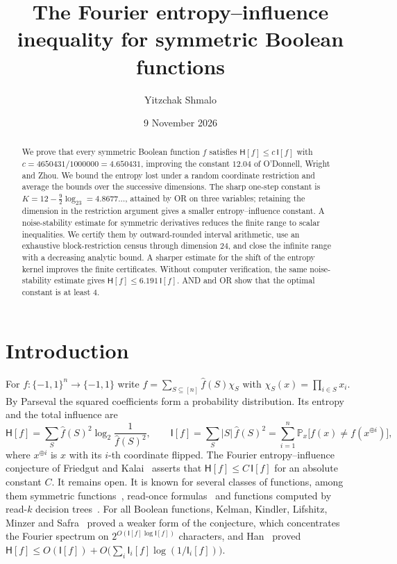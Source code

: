 \documentclass[11pt]{amsart}
\title[Fourier entropy of symmetric functions]{The Fourier entropy--influence inequality for symmetric Boolean functions}
\author{Yitzchak Shmalo}
\date{9 November 2026}
\theoremstyle{definition}
\theoremstyle{remark}
\newcommand{\bits}{\{-1,1\}}
\renewcommand{\P}{\mathbb P}
\newcommand{\HH}{\mathsf H}
\newcommand{\I}{\mathsf I}
\newcommand{\wh}[1]{\widehat{#1}}
\begin{document}
\begin{abstract}
We prove that every symmetric Boolean function $f$ satisfies $\HH[f]\le c\,\I[f]$ with $c=4650431/1000000=4.650431$, improving the constant $12.04$ of O'Donnell, Wright and Zhou. We bound the entropy lost under a random coordinate restriction and average the bounds over the successive dimensions. The sharp one-step constant is $K=12-\frac92\log_23=4.8677\ldots$, attained by OR on three variables; retaining the dimension in the restriction argument gives a smaller entropy--influence constant. A noise-stability estimate for symmetric derivatives reduces the finite range to scalar inequalities. We certify them by outward-rounded interval arithmetic, use an exhaustive block-restriction census through dimension $24$, and close the infinite range with a decreasing analytic bound. A sharper estimate for the shift of the entropy kernel improves the finite certificates. Without computer verification, the same noise-stability estimate gives $\HH[f]\le6.191\,\I[f]$. AND and OR show that the optimal constant is at least $4$.
\end{abstract}
\maketitle

\section{Introduction}

For $f:\bits^n\to\bits$ write $f=\sum_{S\subseteq[n]}\wh f(S)\chi_S$ with $\chi_S(x)=\prod_{i\in S}x_i$. By Parseval the squared coefficients form a probability distribution. Its entropy and the total influence are
\[
 \HH[f]=\sum_{S}\wh f(S)^2\log_2\frac{1}{\wh f(S)^2},\qquad
 \I[f]=\sum_S|S|\,\wh f(S)^2=\sum_{i=1}^n\P_x\bigl[f(x)\ne f(x^{\oplus i})\bigr],
\]
where $x^{\oplus i}$ is $x$ with its $i$-th coordinate flipped. The Fourier entropy--influence conjecture of Friedgut and Kalai~\cite{FK96} asserts that $\HH[f]\le C\,\I[f]$ for an absolute constant $C$. It remains open. It is known for several classes of functions, among them symmetric functions~\cite{OWZ11,KMS12,CKLS16,ACKSW21,Shm26}, read-once formulas~\cite{OT13} and functions computed by read-$k$ decision trees~\cite{WWW14}. For all Boolean functions, Kelman, Kindler, Lifshitz, Minzer and Safra~\cite{KKLMS20} proved a weaker form of the conjecture, which concentrates the Fourier spectrum on $2^{O(\I[f]\log\I[f])}$ characters, and Han~\cite{Han25} proved $\HH[f]\le O(\I[f])+O\bigl(\sum_i\I_i[f]\log(1/\I_i[f])\bigr)$.
\end{document}
